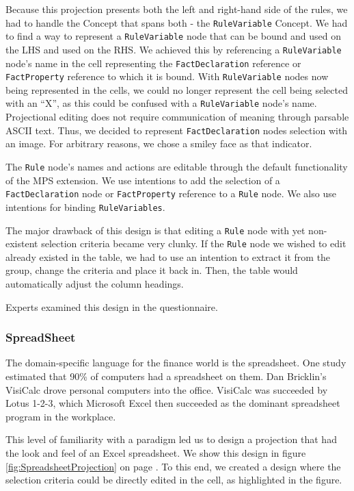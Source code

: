 Because this projection presents both the left and right-hand side of the rules, we had to handle the Concept that spans both - the \texttt{RuleVariable} Concept.
We had to find a way to represent a \texttt{RuleVariable} node that can be bound and used on the LHS and used on the RHS.
We achieved this by referencing a \texttt{RuleVariable} node's name in the cell representing the \texttt{FactDeclaration} reference or \texttt{FactProperty} reference to which it is bound.
With \texttt{RuleVariable} nodes now being represented in the cells, we could no longer represent the cell being selected with an ``X'', as this could be confused with a \texttt{RuleVariable} node's name.
Projectional editing does not require communication of meaning through parsable ASCII text.
Thus, we decided to represent \texttt{FactDeclaration} nodes selection with an image.
For arbitrary reasons, we chose a smiley face as that indicator.

The \texttt{Rule} node's names and actions are editable through the default functionality of the MPS extension.
We use intentions to add the selection of a \texttt{FactDeclaration} node or \texttt{FactProperty} reference to a \texttt{Rule} node.
We also use intentions for binding \texttt{RuleVariables}.

The major drawback of this design is that editing a \texttt{Rule} node with yet non-existent selection criteria became very clunky.
If the \texttt{Rule} node we wished to edit already existed in the table, we had to use an intention to extract it from the group, change the criteria and place it back in.
Then, the table would automatically adjust the column headings.

Experts examined this design in the questionnaire.

\subsubsection{SpreadSheet}

The domain-specific language for the finance world is the spreadsheet.
One study estimated that 90\% of computers had a spreadsheet on them\cite{bradley2009using}.
Dan Bricklin's VisiCalc drove personal computers into the office.
VisiCalc was succeeded by Lotus 1-2-3, which Microsoft Excel then succeeded as the dominant spreadsheet program in the workplace.

This level of familiarity with a paradigm led us to design a projection that had the look and feel of an Excel spreadsheet.
We show this design in figure \ref{fig:SpreadsheetProjection} on page \pageref{fig:SpreadsheetProjection}.
To this end, we created a design where the selection criteria could be directly edited in the cell, as highlighted in the figure.

